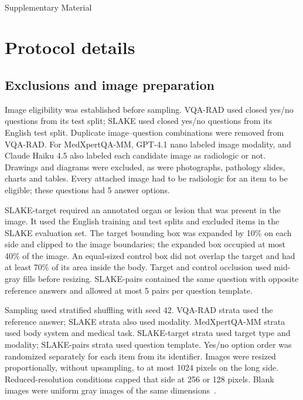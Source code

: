 \clearpage
\onecolumn
\setcounter{page}{1}
\begin{center}\Large\textbf{\thetitle}\\\vspace{0.5em}Supplementary Material\\\vspace{1.0em}\end{center}
\setcounter{table}{0}
\setcounter{figure}{0}
\setcounter{section}{0}

\section{Protocol details}\label{sec:supp-protocol}

\subsection{Exclusions and image preparation}
Image eligibility was established before sampling. VQA-RAD used closed yes/no questions from its test split; SLAKE used closed yes/no questions from its English test split. Duplicate image--question combinations were removed from VQA-RAD. For MedXpertQA-MM, GPT-4.1 nano labeled image modality, and Claude Haiku 4.5 also labeled each candidate image as radiologic or not. Drawings and diagrams were excluded, as were photographs, pathology slides, charts and tables. Every attached image had to be radiologic for an item to be eligible; these questions had 5 answer options.

SLAKE-target required an annotated organ or lesion that was present in the image. It used the English training and test splits and excluded items in the SLAKE evaluation set. The target bounding box was expanded by 10\% on each side and clipped to the image boundaries; the expanded box occupied at most 40\% of the image. An equal-sized control box did not overlap the target and had at least 70\% of its area inside the body. Target and control occlusion used mid-gray fills before resizing. SLAKE-pairs contained the same question with opposite reference answers and allowed at most 5 pairs per question template.

Sampling used stratified shuffling with seed 42. VQA-RAD strata used the reference answer; SLAKE strata also used modality. MedXpertQA-MM strata used body system and medical task. SLAKE-target strata used target type and modality; SLAKE-pairs strata used question template. Yes/no option order was randomized separately for each item from its identifier. Images were resized proportionally, without upsampling, to at most 1024 pixels on the long side. Reduced-resolution conditions capped that side at 256 or 128 pixels. Blank images were uniform gray images of the same dimensions~\cite{zafar2026see}.

